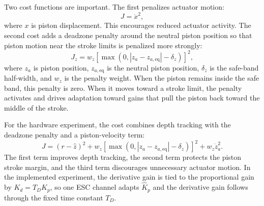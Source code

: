 \documentclass{uhcoethesis}
\begin{document}
Two cost functions are important. The first penalizes actuator motion:
\begin{equation}
    J = \dot{x}^2 ,
    \label{eq:ch3_esc_velocity_cost}
\end{equation}
where $x$ is piston displacement. This encourages reduced actuator activity. The second cost adds a deadzone penalty around the neutral piston position so that piston motion near the stroke limits is penalized more strongly:
\begin{equation}
    J_z =
    w_z
    \left[
        \max\left(0,\left|z_a-z_{a,\mathrm{eq}}\right|-\delta_z\right)
    \right]^2 ,
    \label{eq:ch3_esc_deadzone_cost}
\end{equation}
where $z_a$ is piston position, $z_{a,\mathrm{eq}}$ is the neutral piston position, $\delta_z$ is the safe-band half-width, and $w_z$ is the penalty weight. When the piston remains inside the safe band, this penalty is zero. When it moves toward a stroke limit, the penalty activates and drives adaptation toward gains that pull the piston back toward the middle of the stroke.

For the hardware experiment, the cost combines depth tracking with the deadzone penalty and a piston-velocity term:
\begin{equation}
    J =
    (r-\hat{z})^2
    +
    w_z
    \left[
        \max\left(0,\left|z_a-z_{a,\mathrm{eq}}\right|-\delta_z\right)
    \right]^2
    +
    w_{\dot{z}}\dot{z}_a^2 .
    \label{eq:ch3_esc_experimental_cost}
\end{equation}
The first term improves depth tracking, the second term protects the piston stroke margin, and the third term discourages unnecessary actuator motion. In the implemented experiment, the derivative gain is tied to the proportional gain by $K_d=T_DK_p$, so one ESC channel adapts $\hat{K}_p$ and the derivative gain follows through the fixed time constant $T_D$.
\end{document}
